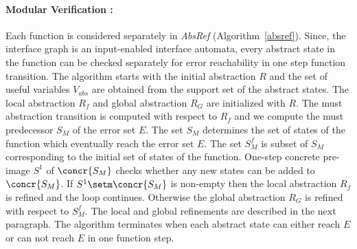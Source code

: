\documentclass{llncs}
\begin{document}
\paragraph{Modular Verification :} Each function is considered separately  in {\em AbsRef} (Algorithm~\ref{absref}).
Since, the interface graph is an input-enabled interface automata, every abstract state in the 
function can be checked separately for error reachability in one step function transition.
 The algorithm starts with the initial abstraction $R$ and the set of useful variables $V_{abs}$
 are obtained from the support set of the abstract states.
The local abstraction $R_f$ and global abstraction $R_G$ are initialized with $R$. 
The must abstraction transition is computed with respect to $R_f$ and we compute the must predecessor $S_M$ of the error set $E$.
The set $S_M$ determines the set of states of the function which eventually reach the error
set $E$.
The set $S^f_M$ is subset of $S_M$ corresponding to  the initial set of states of the function.
One-step concrete pre-image $S^1$ of $\concr{S_M}$ checks whether any new states can be 
added to $\concr{S_M}$.
If $S^1 \setm \concr{S_M}$ is non-empty then the local abstraction $R_f$ is refined and the loop
continues.
Otherwise the global abstraction $R_G$ is refined with respect to $S^f_M$.
The local and global refinements are described in the next paragraph.
The algorithm terminates when each abstract state can either reach $E$ or can not reach $E$ in one
function step. 
\end{document}
